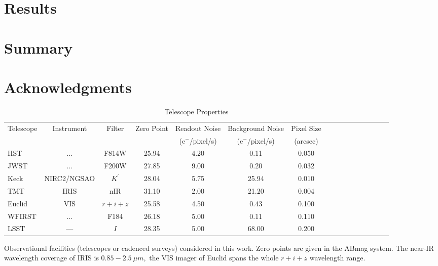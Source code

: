 \documentclass[a4paper,11pt]{article}
\begin{document}
\section{Results}

\section{Summary}

\section*{Acknowledgments}










\clearpage
\begin{table}\footnotesize
\begin{center}
\caption{Telescope Properties}
\begin{tabular}{lccccccccccccccc|}
\hline \hline
Telescope & Instrument & Filter & Zero Point & Readout Noise & Background Noise & Pixel Size \\
 & & & & (e$^-$/pixel/s) & (e$^-$/pixel/s) & (arcsec) \\
\hline
HST  & ...  &   F814W   &   25.94    &   4.20      &    0.11     &     0.050    \\
  JWST & ...  &   F200W   &    27.85   &    9.00     &     0.20    &      0.032  \\
  Keck & NIRC2/NGSAO  &  $K^\prime$ &   28.04    &   5.75     &  25.94      &  0.010      \\
  TMT & IRIS  &  nIR   &    31.10   &      2.00   &     21.20    &      0.004  \\
  Euclid & VIS & $r+i+z$  &    25.58   &      4.50   &     0.43    &      0.100   \\
  WFIRST &  ... & F184    &   26.18    &     5.00    &    0.11     &     0.110   \\
  LSST   & ---  &   $I$    &     28.35  &       5.00  &      68.00   &        0.200  \\
\hline
\hline
\end{tabular}
\begin{tablenotes}
\item 
Observational facilities (telescopes or cadenced surveys) considered in this work.
 Zero points are given in the ABmag system. The near-IR wavelength coverage of IRIS is $0.85-2.5~\mu m,$ the VIS imager of Euclid spans the whole $r+i+z$ wavelength range. \\
\end{tablenotes}
\label{tab:telescopes parameters}
\end{center}
\end{table}
\end{document}
